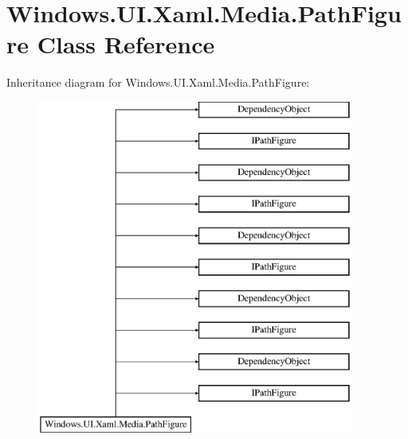 \hypertarget{class_windows_1_1_u_i_1_1_xaml_1_1_media_1_1_path_figure}{}\section{Windows.\+U\+I.\+Xaml.\+Media.\+Path\+Figure Class Reference}
\label{class_windows_1_1_u_i_1_1_xaml_1_1_media_1_1_path_figure}
Inheritance diagram for Windows.\+U\+I.\+Xaml.\+Media.\+Path\+Figure\+:\begin{figure}[H]
\begin{center}
\leavevmode
\includegraphics[height=11.000000cm]{class_windows_1_1_u_i_1_1_xaml_1_1_media_1_1_path_figure}
\end{center}
\end{figure}
